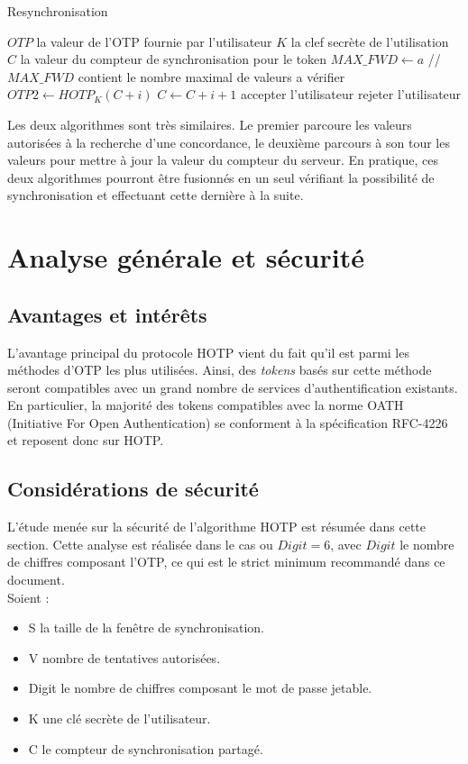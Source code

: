 \documentclass{../res/univ-projet}
\begin{document}
  \begin{algorithm}
    \caption{Resynchronisation}
    \label{HOTP:synch}
    
    \begin{algorithmic}
      \REQUIRE $OTP$ la valeur de l'OTP fournie par l'utilisateur
      \REQUIRE $K$ la clef secrète de l'utilisation
      \REQUIRE $C$ la valeur du compteur de synchronisation pour le token
      \STATE $MAX\_FWD \leftarrow a$ //$MAX\_FWD$ contient le nombre maximal de valeurs a vérifier
        \STATE $OTP2 \leftarrow HOTP_K(C + i)$
          \STATE $C \leftarrow C + i + 1$
          \STATE accepter l'utilisateur
        \ENDIF
      \ENDFOR
      \STATE rejeter l'utilisateur
    \end{algorithmic}
  \end{algorithm}
  
  Les deux algorithmes sont très similaires. Le premier parcoure les valeurs autorisées à la recherche d'une concordance, le deuxième parcours à son tour les valeurs pour 
  mettre à jour la valeur du compteur du serveur. En pratique, ces deux algorithmes pourront être fusionnés en un seul vérifiant la possibilité de synchronisation et 
  effectuant cette dernière à la suite.
  
\section{Analyse générale et sécurité}

  \subsection{Avantages et intérêts}
  L'avantage principal du protocole \og{}HOTP\fg{} vient du fait qu'il est parmi les méthodes d'OTP les plus utilisées. Ainsi, des \emph{tokens} basés sur cette méthode 
  seront compatibles avec un grand nombre de services d'authentification existants. En particulier, la majorité des tokens compatibles avec la norme OATH (Initiative For 
  Open Authentication) se conforment à la spécification RFC-4226 et reposent donc sur HOTP.
  
  \subsection{Considérations de sécurité}
  L'étude menée sur la sécurité de l'algorithme HOTP est résumée dans cette section.
  Cette analyse est réalisée dans le cas ou $Digit = 6$, avec $Digit$ le nombre de chiffres composant l'OTP, ce qui est le strict minimum 
  recommandé dans ce document.\\
  Soient :
  \begin{itemize}
   \item S la taille de la fenêtre de synchronisation.
   \item V nombre de tentatives autorisées.
   \item Digit le nombre de chiffres composant le mot de passe jetable.
   \item K une clé secrète de l'utilisateur.
   \item C le compteur de synchronisation partagé.
  \end{itemize}
\end{document}
